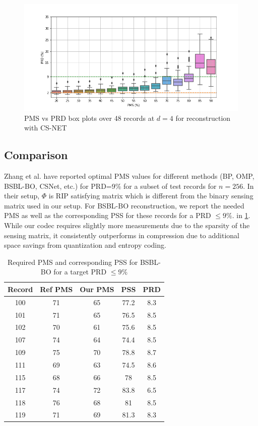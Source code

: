 \begin{figure}
\centering
\includegraphics[width=0.95\linewidth]{images/csnet/pms-vs-prd-boxplot.png}
\caption{PMS vs PRD box plots over 48 records at $d=4$ for reconstruction
with CS-NET}
\label{fig-res-csnet-pms-prd-boxplot}
\end{figure}


\subsection{Comparison}
Zhang et al. \cite{zhang2021csnet} have reported
optimal PMS values for different methods (BP, OMP, BSBL-BO, CSNet, etc.)
for PRD=9\% for a subset of test records for $n=256$.
In their setup, $\Phi$ is RIP satisfying matrix which is different
from the binary sensing matrix used in our setup.
For BSBL-BO reconstruction,
we report the needed PMS as well as the corresponding PSS
for these records for a PRD $\leq 9 \%$.
in \cref{tbl-bsbl-optimal-pss-prd}.
While our codec requires slightly more measurements
due to the sparsity of the sensing matrix, it consistently
outperforms in compression due to additional space
savings from quantization and entropy coding.

\begin{table}[ht]
\centering
\caption{Required PMS and corresponding PSS for BSBL-BO for
a target PRD $\leq 9\%$}
\begin{tabular}{ccccc}
\toprule
Record & Ref PMS & Our PMS & PSS & PRD\\
\midrule 
100 & 71 & 65 & 77.2 & 8.3 \\  
101 & 71 & 65 & 76.5 & 8.5 \\  
102 & 70 & 61 & 75.6 & 8.5 \\  
107 & 74 & 64 & 74.4 & 8.5 \\  
109 & 75 & 70 & 78.8 & 8.7 \\  
111 & 69 & 63 & 74.5 & 8.6 \\
115 & 68 & 66 & 78 & 8.5 \\  
117 & 74 & 72 & 83.8 & 6.5 \\  
118 & 76 & 68 & 81 & 8.5 \\  
119 & 71 & 69 & 81.3 & 8.3 \\
\bottomrule
\end{tabular}
\label{tbl-bsbl-optimal-pss-prd}
\end{table}
